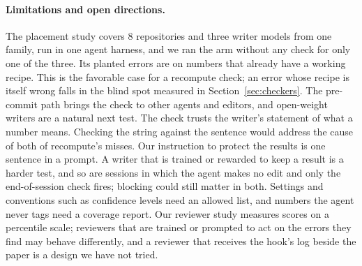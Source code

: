 \paragraph{Limitations and open directions.}
The placement study covers 8 repositories and three writer models from one family, run in one agent harness, and we
ran the arm without any check for only one of the three. Its planted errors are on numbers that already have a
working recipe. This is the favorable case for a recompute check; an error whose recipe is itself wrong falls in the
blind spot measured in Section~\ref{sec:checkers}. The pre-commit
path brings the check to other agents and editors, and open-weight writers are a natural next test. The check trusts
the writer's statement of what a number means. Checking the  string against the sentence would address
the cause of both of recompute's misses. Our instruction to protect the results is one
sentence in a prompt. A writer that is trained or rewarded to keep a result is a harder test, and so are sessions in
which the agent makes no edit and only the end-of-session check fires; blocking could still matter in both. Settings and conventions such as confidence
levels need an allowed list, and numbers the agent never tags need a coverage report. Our reviewer study measures
scores on a percentile scale; reviewers that are trained or prompted to act on the errors they find may behave
differently, and a reviewer that receives the hook's log beside the paper is a design we have not tried.
